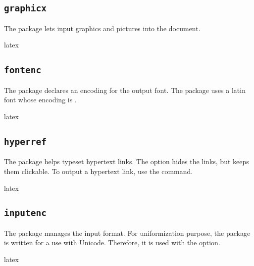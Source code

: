 \documentclass{report}
\begin{document}
\subsection{\texttt{graphicx}}

The  package lets input graphics and pictures into the document.

\begin{imtaCode}{latex}
\RequirePackage{graphicx}
\end{imtaCode}


\subsection{\texttt{fontenc}}

The  package declares an encoding for the output font.
The  package uses a latin font whose encoding is .

\begin{imtaCode}{latex}
\RequirePackage[T1]{fontenc}
\end{imtaCode}


\subsection{\texttt{hyperref}}

The  package helps typeset hypertext links.
The  option hides the links, but keeps them clickable.
To output a hypertext link, use the  command.

\begin{imtaCode}{latex}
\RequirePackage[hidelinks]{hyperref}
\end{imtaCode}


\subsection{\texttt{inputenc}}

The  package manages the input format.
For uniformization purpose, the  package is written for a use with Unicode.
Therefore, it is used with the  option.

\begin{imtaCode}{latex}
\RequirePackage[utf8]{inputenc}
\end{imtaCode}
\end{document}
